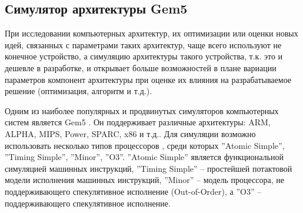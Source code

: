 


\subsection{Симулятор архитектуры Gem5}

    При исследовании компьютерных архитектур, их оптимизации или оценки новых идей, связанных с
    параметрами таких архитектур, чаще всего используют не конечное устройство, а симуляцию
    архитектуры такого устройства, т.к. это и дешевле в разработке,
    и открывает больше возможностей в плане вариации параметров компонент архитектуры при оценке
    их влияния на разрабатываемое решение (оптимизация, алгоритм и т.д.).

    Одним из наиболее популярных и продвинутых симуляторов компьютерных систем является Gem5
    \cite{binkert2011gem5}. Он поддерживает различные архитектуры: ARM, ALPHA, MIPS,
    Power, SPARC, x86 и т.д.. Для симуляции возможно использовать несколько типов процессоров
    \cite{gem52017ArchExpl}, среди которых ''Atomic Simple'', ''Timing Simple'', ''Minor'',
    ''O3''. ''Atomic Simple'' является функциональной симуляцией машинных инструкций,
    ''Timing Simple'' -- простейшей потактовой модели исполнения машинных инструкций,
    ''Minor'' -- модель процессора, не поддерживающего спекулятивное исполнение (Out-of-Order),
    а ''O3'' -- поддерживающего спекулятивное исполнение.

